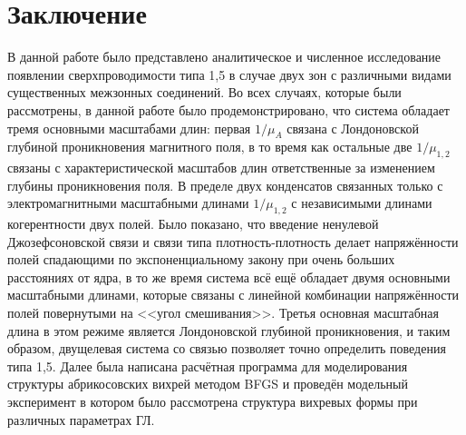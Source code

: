 \chapter*{Заключение}

В данной работе было представлено аналитическое и численное исследование 
появлении сверхпроводимости типа 1,5 в случае двух зон с различными видами 
существенных межзонных соединений. Во всех случаях, которые были рассмотрены, в 
данной работе было продемонстрировано, что система обладает тремя основными 
масштабами длин: первая \( 1/\mu_A \) связана с Лондоновской глубиной 
проникновения магнитного поля, в то время как остальные две \( 1/\mu_{1,2} \) 
связаны с характеристической масштабов длин ответственные за изменением 
глубины проникновения поля. В пределе двух конденсатов связанных только с 
электромагнитными масштабными длинами \( 1/\mu_{1,2} \) с независимыми  
длинами когерентности двух полей. Было показано, что введение ненулевой 
Джозефсоновской связи и связи типа плотность-плотность делает напряжённости 
полей спадающими по экспоненциальному закону при очень больших расстояниях от 
ядра, в то же время система всё ещё обладает двумя основными масштабными 
длинами, которые связаны с линейной комбинации напряжённости полей повернутыми 
на <<угол смешивания>>. Третья основная масштабная длина в этом режиме является 
Лондоновской глубиной проникновения, и таким образом, двущелевая система со 
связью позволяет точно определить поведения типа 1,5. Далее была написана 
расчётная программа для моделирования структуры абрикосовских вихрей методом 
BFGS и проведён модельный эксперимент в котором было рассмотрена структура 
вихревых формы при различных параметрах ГЛ.

\newpage